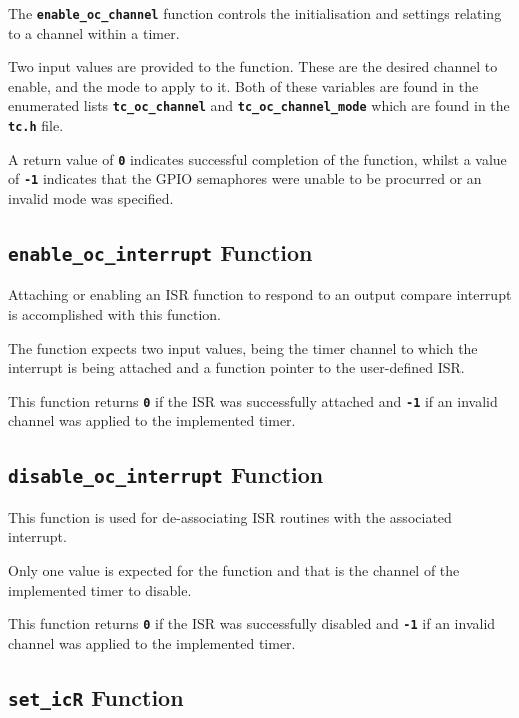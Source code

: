 \documentclass[a4paper, oneside, 11pt, titlepage, onecolumn, openright]{report}
\begin{document}
					The \textbf{\texttt{enable\_oc\_channel}} function controls the initialisation and settings relating to a channel within a timer. 
						
Two input values are provided to the function. These are the desired channel to enable, and the mode to apply to it. Both of these variables are found in the enumerated lists \textbf{\texttt{tc\_oc\_channel}} and \textbf{\texttt{tc\_oc\_channel\_mode}} which are found in the \textbf{\texttt{tc.h}} file.
			
A return value of \textbf{\texttt{0}} indicates successful completion of the function, whilst a value of \textbf{\texttt{-1}} indicates that the GPIO semaphores were unable to be procurred or an invalid mode was specified.
			
				\subsection{\textbf{\texttt{enable\_oc\_interrupt}} Function}
					\label{ss:Hardware Abstraction Libraries:tc Module:enable_oc_interrupt Function}
			
					Attaching or enabling an ISR function to respond to an output compare interrupt is accomplished with this function.
			
The function expects two input values, being the timer channel to which the interrupt is being attached and a function pointer to the user-defined ISR.
			
This function returns \textbf{\texttt{0}} if the ISR was successfully attached and \textbf{\texttt{-1}} if an invalid channel was applied to the implemented timer.
			
				\subsection{\textbf{\texttt{disable\_oc\_interrupt}} Function}
					\label{ss:Hardware Abstraction Libraries:tc Module:disable_oc_interrupt Function}
			
					This function is used for de-associating ISR routines with the associated interrupt.
			
Only one value is expected for the function and that is the channel of the implemented timer to disable.
			
This function returns \textbf{\texttt{0}} if the ISR was successfully disabled and \textbf{\texttt{-1}} if an invalid channel was applied to the implemented timer.
			
				\subsection{\textbf{\texttt{set\_icR}} Function}
					\label{ss:Hardware Abstraction Libraries:tc Module:set_icR Function}
			
\end{document}

